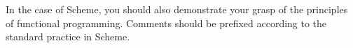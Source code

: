 \documentclass[12pt,info]{asg}
\begin{document}
In the case of Scheme, you should also demonstrate your grasp of the principles of functional programming. Comments should be prefixed according to the standard practice in Scheme.


\end{document}

